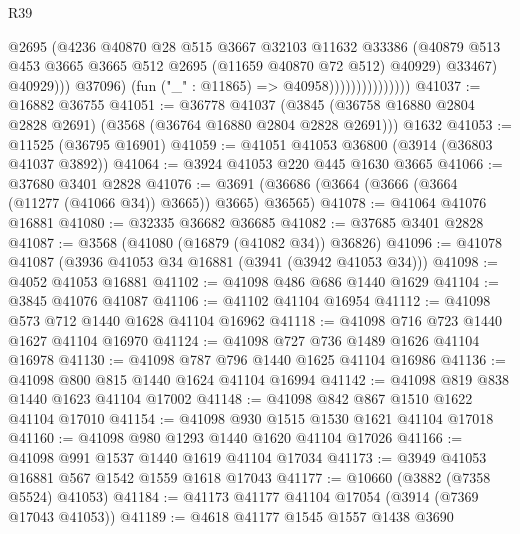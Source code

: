 \begin{lexlean}{R39}
\begin{coremodule}
                                        @2695
                                        (@4236
                                          @40870
                                          @28
                                          @515
                                          @3667
                                          @32103
                                          @11632
                                          @33386
                                          (@40879
                                            @513
                                            @453
                                            @3665
                                            @3665
                                            @512
                                            @2695
                                            (@11659 @40870 @72 @512)
                                            @40929)
                                          @33467)
                                        @40929)))
                                  @37096)
                                (fun ("_" : @11865) => @40958)))))))))))))))
@41037 := @16882 @36755
@41051 := @36778
    @41037
    (@3845 (@36758 @16880 @2804 @2828 @2691) (@3568 (@36764 @16880 @2804 @2828 @2691)))
    @1632
@41053 := @11525 (@36795 @16901)
@41059 := @41051 @41053 @36800 (@3914 (@36803 @41037 @3892))
@41064 := @3924 @41053 @220 @445 @1630 @3665
@41066 := @37680 @3401 @2828
@41076 := @3691 (@36686 (@3664 (@3666 (@3664 (@11277 (@41066 @34)) @3665)) @3665) @36565)
@41078 := @41064 @41076 @16881
@41080 := @32335 @36682 @36685
@41082 := @37685 @3401 @2828
@41087 := @3568 (@41080 (@16879 (@41082 @34)) @36826)
@41096 := @41078 @41087 (@3936 @41053 @34 @16881 (@3941 (@3942 @41053 @34)))
@41098 := @4052 @41053 @16881
@41102 := @41098 @486 @686 @1440 @1629
@41104 := @3845 @41076 @41087
@41106 := @41102 @41104 @16954
@41112 := @41098 @573 @712 @1440 @1628 @41104 @16962
@41118 := @41098 @716 @723 @1440 @1627 @41104 @16970
@41124 := @41098 @727 @736 @1489 @1626 @41104 @16978
@41130 := @41098 @787 @796 @1440 @1625 @41104 @16986
@41136 := @41098 @800 @815 @1440 @1624 @41104 @16994
@41142 := @41098 @819 @838 @1440 @1623 @41104 @17002
@41148 := @41098 @842 @867 @1510 @1622 @41104 @17010
@41154 := @41098 @930 @1515 @1530 @1621 @41104 @17018
@41160 := @41098 @980 @1293 @1440 @1620 @41104 @17026
@41166 := @41098 @991 @1537 @1440 @1619 @41104 @17034
@41173 := @3949 @41053 @16881 @567 @1542 @1559 @1618 @17043
@41177 := @10660 (@3882 (@7358 @5524) @41053)
@41184 := @41173 @41177 @41104 @17054 (@3914 (@7369 @17043 @41053))
@41189 := @4618 @41177 @1545 @1557 @1438 @3690

\end{coremodule}
\end{lexlean}
